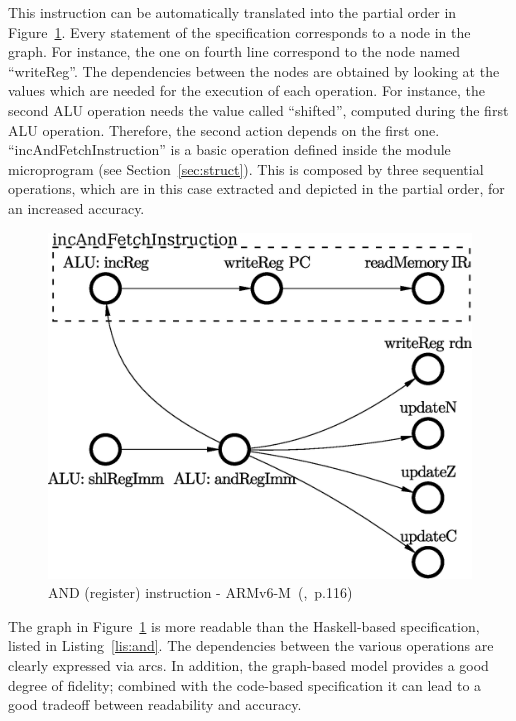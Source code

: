 \documentclass[conference]{IEEEtran}
\begin{document}
\noindent
This instruction can be automatically translated into the partial order in
Figure~\ref{fig:andPO}. Every statement of the specification corresponds to a node in the
graph. For instance, the one on fourth line correspond to the node named ``writeReg''.
The dependencies between the nodes are obtained by looking at the values which are needed for
the execution of each operation. For instance, the second ALU operation needs the value
called ``shifted'', computed during the first ALU operation. Therefore, the second action
depends on the first one.
``incAndFetchInstruction'' is a basic operation defined inside the module microprogram (see
Section~\ref{sec:struct}). This is composed by three sequential operations, which are in this
case extracted and depicted in the partial order, for an increased accuracy.

\begin{figure}[ht!]
\begin{center}
	\includegraphics[width=\linewidth]{IMG/and_RegT1.eps}
	\caption{AND (register) instruction - ARMv6-M~(\cite{armManual},~p.116)}
	\label{fig:andPO}
\end{center}
\end{figure}

The graph in Figure~\ref{fig:andPO} is more readable than the Haskell-based specification,
listed in Listing~\ref{lis:and}. The dependencies between the various operations are
clearly expressed via arcs. In addition, the graph-based model provides a good degree
of fidelity; combined with the code-based specification it can lead to a good tradeoff
between readability and accuracy.
\end{document}
